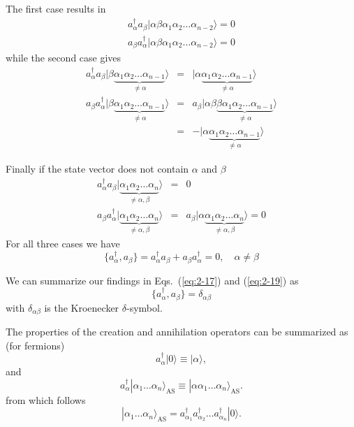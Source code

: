 \documentclass[graybox,sectrefs,envcountresetchap,open=right]{svmonodo}
\begin{document}
The first case results in
\begin{eqnarray}
	a_\alpha^{\dagger} a_\beta |\alpha\beta\alpha_1\alpha_2 \dots \alpha_{n-2}\rangle = 0 \nonumber \\
	a_\beta a_\alpha^{\dagger} |\alpha\beta\alpha_1\alpha_2 \dots \alpha_{n-2}\rangle = 0 \label{eq:2-18a}
\end{eqnarray}
while the second case gives
\begin{eqnarray}
	 a_\alpha^{\dagger} a_\beta |\beta \underbrace{\alpha_1\alpha_2 \dots \alpha_{n-1}}_{\neq \alpha}\rangle &=& 
	 	|\alpha \underbrace{\alpha_1\alpha_2 \dots \alpha_{n-1}}_{\neq  \alpha}\rangle \nonumber \\
	a_\beta a_\alpha^{\dagger} |\beta \underbrace{\alpha_1\alpha_2 \dots \alpha_{n-1}}_{\neq \alpha}\rangle &=&
		a_\beta |\alpha\beta\underbrace{\beta \alpha_1\alpha_2 \dots \alpha_{n-1}}_{\neq \alpha}\rangle \nonumber \\
	&=& - |\alpha\underbrace{\alpha_1\alpha_2 \dots \alpha_{n-1}}_{\neq \alpha}\rangle \label{eq:2-18b}
\end{eqnarray}




Finally if the state vector does not contain $\alpha$ and $\beta$
\begin{eqnarray}
	a_\alpha^{\dagger} a_\beta |\underbrace{\alpha_1\alpha_2 \dots \alpha_{n}}_{\neq \alpha,\beta}\rangle &=& 0 \nonumber \\
	a_\beta a_\alpha^{\dagger} |\underbrace{\alpha_1\alpha_2 \dots \alpha_{n}}_{\neq \alpha,\beta}\rangle &=& 
		a_\beta |\alpha \underbrace{\alpha_1\alpha_2 \dots \alpha_{n}}_{\neq \alpha,\beta}\rangle = 0 \label{eq:2-18c}
\end{eqnarray}
For all three cases we have
\begin{equation}
	\{a_\alpha^{\dagger},a_\beta \} = a_\alpha^{\dagger} a_\beta + a_\beta a_\alpha^{\dagger} = 0, \quad \alpha \neq \beta \label{eq:2-19}
\end{equation}




We can summarize  our findings in Eqs.~(\ref{eq:2-17}) and (\ref{eq:2-19}) as 
\begin{equation}
	\{a_\alpha^{\dagger},a_\beta \} = \delta_{\alpha\beta} \label{eq:2-20}
\end{equation}
with  $\delta_{\alpha\beta}$ is the Kroenecker $\delta$-symbol.

The properties of the creation and annihilation operators can be summarized as (for fermions)
\[
	a_\alpha^{\dagger}|0\rangle \equiv  |\alpha\rangle,
\]
and
\[
	a_\alpha^{\dagger}|\alpha_1\dots \alpha_n\rangle_{\mathrm{AS}} \equiv  |\alpha\alpha_1\dots \alpha_n\rangle_{\mathrm{AS}}. 
\]
from which follows
\[
        |\alpha_1\dots \alpha_n\rangle_{\mathrm{AS}} = a_{\alpha_1}^{\dagger} a_{\alpha_2}^{\dagger} \dots a_{\alpha_n}^{\dagger} |0\rangle.
\]
\end{document}
